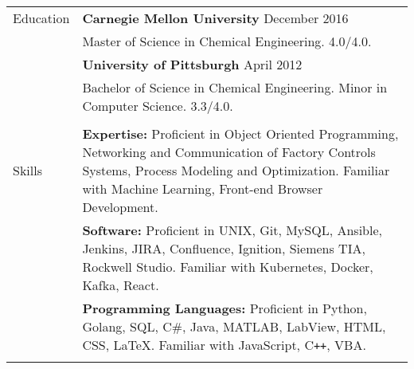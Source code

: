 \documentclass[11pt]{article}
\begin{document}
\begin{tabular}[t]{@{}p{1.05in} @{}p{6.00in}}
{Education}
&
\textbf{Carnegie Mellon University} \hfill December 2016 \vspace{0.015in} \\ &
Master of Science in Chemical Engineering. 4.0/4.0. \vspace{0.015in}
\vspace{0.5\baselineskip}
\\
&
\textbf{University of Pittsburgh} \hfill April 2012 \vspace{0.015in} \\ &
Bachelor of Science in Chemical Engineering. Minor in Computer Science. 3.3/4.0. \vspace{0.015in}
\vspace{0.5\baselineskip}
\\
\\

{Skills}
&
\textbf{Expertise:} Proficient in Object Oriented Programming, Networking and Communication of Factory Controls Systems, Process Modeling and Optimization. Familiar with Machine Learning, Front-end Browser Development.%
\vspace{0.5\baselineskip}
\\
&
\textbf{Software:} Proficient in UNIX, Git, MySQL, Ansible, Jenkins, JIRA, Confluence, Ignition, Siemens TIA, Rockwell Studio. Familiar with Kubernetes, Docker, Kafka, React.%
\vspace{0.5\baselineskip}
\\
&
\textbf{Programming Languages:} Proficient in Python, Golang, SQL, C\#, Java, MATLAB, LabView, HTML, CSS, \LaTeX. Familiar with JavaScript, C{}\verb!++!, VBA.%
\vspace{0.5\baselineskip}
\\
\\

\end{tabular}
\end{document}
